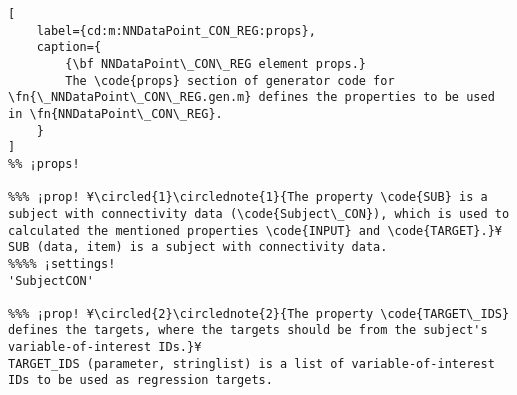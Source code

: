 \documentclass{tufte-handout}
\begin{document}
\begin{lstlisting}[
	label={cd:m:NNDataPoint_CON_REG:props},
	caption={
		{\bf NNDataPoint\_CON\_REG element props.}
		The \code{props} section of generator code for \fn{\_NNDataPoint\_CON\_REG.gen.m} defines the properties to be used in \fn{NNDataPoint\_CON\_REG}.
	}
]
%% ¡props!

%%% ¡prop! ¥\circled{1}\circlednote{1}{The property \code{SUB} is a subject with connectivity data (\code{Subject\_CON}), which is used to calculated the mentioned properties \code{INPUT} and \code{TARGET}.}¥
SUB (data, item) is a subject with connectivity data.
%%%% ¡settings!
'SubjectCON'

%%% ¡prop! ¥\circled{2}\circlednote{2}{The property \code{TARGET\_IDS} defines the targets, where the targets should be from the subject's variable-of-interest IDs.}¥
TARGET_IDS (parameter, stringlist) is a list of variable-of-interest IDs to be used as regression targets.

\end{lstlisting}

\clearpage
\end{document}
